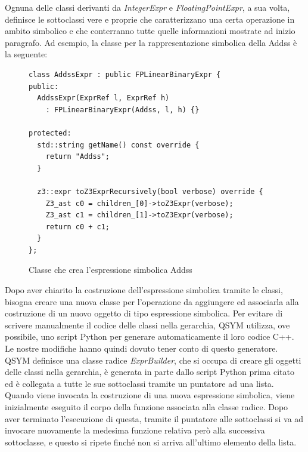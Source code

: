 \documentclass[Lau, oneside]{sapthesis}%
\begin{document}
\newpage
Ognuna delle classi derivanti da \textit{IntegerExpr} e \textit{FloatingPointExpr}, a sua volta, definisce le sottoclassi vere e proprie che caratterizzano una certa operazione in ambito simbolico e che conterranno tutte quelle informazioni mostrate ad inizio paragrafo.
\newline \newline
Ad esempio, la classe per la rappresentazione simbolica della Addss è la seguente:
\begin{figure}[h]
\begin{lstlisting}[xleftmargin=0\textwidth, language=SymQEMU, basicstyle=\small]
class AddssExpr : public FPLinearBinaryExpr {
public:
  AddssExpr(ExprRef l, ExprRef h)
    : FPLinearBinaryExpr(Addss, l, h) {}

protected:
  std::string getName() const override {
    return "Addss";
  }

  z3::expr toZ3ExprRecursively(bool verbose) override {
    Z3_ast c0 = children_[0]->toZ3Expr(verbose);
    Z3_ast c1 = children_[1]->toZ3Expr(verbose);
    return c0 + c1;
  }
};
\end{lstlisting}
    \caption{Classe che crea l'espressione simbolica Addss}
    \label{fig:AddssExpr}
\end{figure}
\newline \newline
Dopo aver chiarito la costruzione dell'espressione simbolica tramite le classi, bisogna creare una nuova classe per l'operazione da aggiungere ed associarla alla costruzione di un nuovo oggetto di tipo espressione simbolica.
\newline \newline
Per evitare di scrivere manualmente il codice delle classi nella gerarchia, QSYM utilizza,  ove possibile, uno script Python per generare automaticamente il loro codice C++.
Le nostre modifiche hanno quindi dovuto tener conto di questo generatore.
\newline \newline
QSYM definisce una classe radice \textit{ExprBuilder}, che si occupa di creare gli oggetti delle classi nella gerarchia, è generata in parte dallo script Python prima citato ed è collegata a tutte le sue sottoclassi tramite un puntatore ad una lista.
\newline
Quando viene invocata la costruzione di una nuova espressione simbolica, viene inizialmente eseguito il corpo della funzione associata alla classe radice.
\newline
Dopo aver terminato l'esecuzione di questa, tramite il puntatore alle sottoclassi si va ad invocare nuovamente la medesima funzione relativa però alla successiva sottoclasse, e questo si ripete finché non si arriva all'ultimo elemento della lista.
\end{document}
